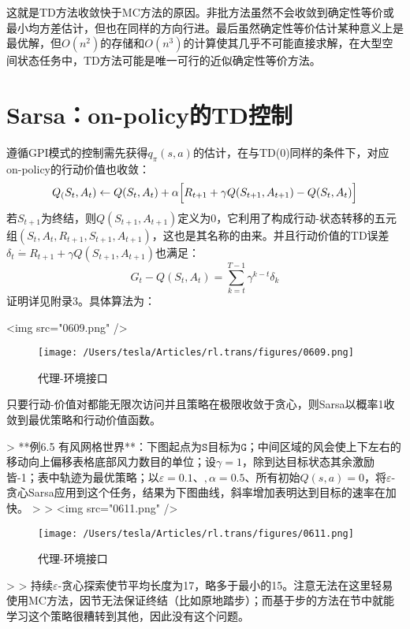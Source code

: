\documentclass{ctexart}
\begin{document}
这就是TD方法收敛快于MC方法的原因。非批方法虽然不会收敛到确定性等价或最小均方差估计，但也在同样的方向行进。最后虽然确定性等价估计某种意义上是最优解，但$O(n^2)$的存储和$O(n^3)$的计算使其几乎不可能直接求解，在大型空间状态任务中，TD方法可能是唯一可行的近似确定性等价方法。



\section{Sarsa：on-policy的TD控制}

遵循GPI模式的控制需先获得$q_\pi(s,a)$的估计，在与TD(0)同样的条件下，对应on-policy的行动价值也收敛：
\begin{equation}
Q_(S_t,A_t) \leftarrow Q(S_t,A_t) + \alpha\Bigl[ R_{t+1} + \gamma Q(S_{t+1}, A_{t+1}) - Q(S_t,A_t) \Bigr]
\end{equation}
若$S_{t+1}$为终结，则$Q(S_{t+1},A_{t+1})$定义为0，它利用了构成行动-状态转移的五元组$(S_t,A_t,R_{t+1},S_{t+1},A_{t+1})$，这也是其名称的由来。并且行动价值的TD误差$\delta_t\dot=R_{t+1}+\gamma Q(S_{t+1},A_{t+1})$也满足：
\begin{equation}
G_t-Q(S_t,A_t)=\sum_{k=t}^{T-1}\gamma^{k-t}\delta_k
\end{equation}
证明详见附录3。具体算法为：

<img src="0609.png" />
\begin{figure}[htbp]
    \centering
    \texttt{[image: /Users/tesla/Articles/rl.trans/figures/0609.png]}
    \caption{代理-环境接口}
    \label{fig:0609} 
\end{figure}

只要行动-价值对都能无限次访问并且策略在极限收敛于贪心，则Sarsa以概率1收敛到最优策略和行动价值函数。

> **例6.5 有风网格世界**：下图起点为$\mathtt S$目标为$\mathtt G$；中间区域的风会使上下左右的移动向上偏移表格底部风力数目的单位；设$\gamma=1$，除到达目标状态其余激励皆-1；表中轨迹为最优策略；以$\varepsilon=0.1$、$,\alpha=0.5$、所有初始$Q(s,a)=0$，将$\varepsilon$-贪心Sarsa应用到这个任务，结果为下图曲线，斜率增加表明达到目标的速率在加快。
>
> <img src="0611.png" />
\begin{figure}[htbp]
    \centering
    \texttt{[image: /Users/tesla/Articles/rl.trans/figures/0611.png]}
    \caption{代理-环境接口}
    \label{fig:0611} 
\end{figure}
>
> 持续$\varepsilon$-贪心探索使节平均长度为17，略多于最小的15。注意无法在这里轻易使用MC方法，因节无法保证终结（比如原地踏步）；而基于步的方法在节中就能学习这个策略很糟转到其他，因此没有这个问题。
\end{document}
